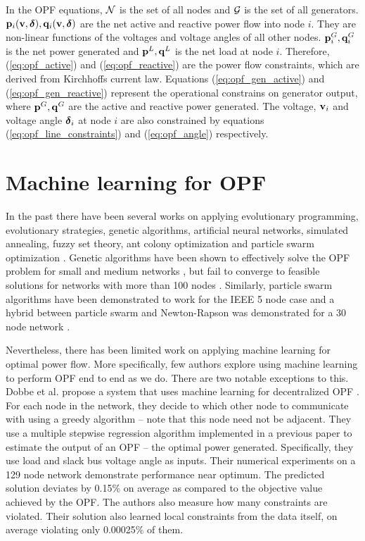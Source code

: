 \documentclass[conference,9pt]{IEEEtran}
\begin{document}
	In the OPF equations, ${\mathcal N}$ is the set of all nodes and ${\mathcal G}$ is the set of all generators. ${\mathbf p}_i({\mathbf v},\boldsymbol{\delta}), {\mathbf q}_i({\mathbf v},\boldsymbol{\delta})$ are the net active and reactive power flow into node $i$. They are non-linear functions of the voltages and voltage angles of all other nodes. ${\mathbf p}^G_i, {\mathbf q}^G_i$ is the net power generated and ${\mathbf p}^L, {\mathbf q}^L$ is the net load at node $i$. Therefore, (\ref{eq:opf_active}) and (\ref{eq:opf_reactive}) are the power flow constraints, which are derived from Kirchhoffs current law. Equations (\ref{eq:opf_gen_active}) and (\ref{eq:opf_gen_reactive}) represent the operational constrains on generator output, where ${\mathbf p}^G, {\mathbf q}^G$ are the active and reactive power generated. The voltage, ${\mathbf v}_i$ and voltage angle $\boldsymbol{\delta}_i$ at node $i$ are also constrained by equations (\ref{eq:opf_line_constraints}) and (\ref{eq:opf_angle}) respectively.
	
	
	\section{Machine learning for OPF}
	In the past there have been several works on applying evolutionary programming, evolutionary strategies, genetic algorithms, artificial neural networks, simulated annealing, fuzzy set theory, ant colony optimization and particle swarm optimization \cite{intelligence}. Genetic algorithms have been shown to effectively solve the OPF problem for small and medium networks \cite{bakirtzis}, but fail to converge to feasible solutions for networks with more than 100 nodes \cite{todorovski}. Similarly, particle swarm algorithms have been demonstrated to work for the IEEE 5 node case \cite{particle} and a hybrid between particle swarm and Newton-Rapson was demonstrated for a 30 node network \cite{hybrid}. 
	
	Nevertheless, there has been limited work on applying machine learning for optimal power flow. More specifically, few authors explore using machine learning to perform OPF end to end as we do. There are two notable exceptions to this. Dobbe et al. \cite{dobbe} propose a system that uses machine learning for decentralized OPF \cite{dobbe}. For each node in the network, they decide to which other node to communicate with using a greedy algorithm -- note that this node need not be adjacent. They use a multiple stepwise regression algorithm implemented in a previous paper \cite{sondermeijer} to estimate the output of an OPF -- the optimal power generated. Specifically, they use load and slack bus voltage angle as inputs. Their numerical experiments on a 129 node network demonstrate performance near optimum. The predicted solution deviates by 0.15\% on average as compared to the objective value achieved by the OPF. The authors also measure how many constraints are violated. Their solution also learned local constraints from the data itself, on average violating only 0.00025\% of them.
	
\end{document}
